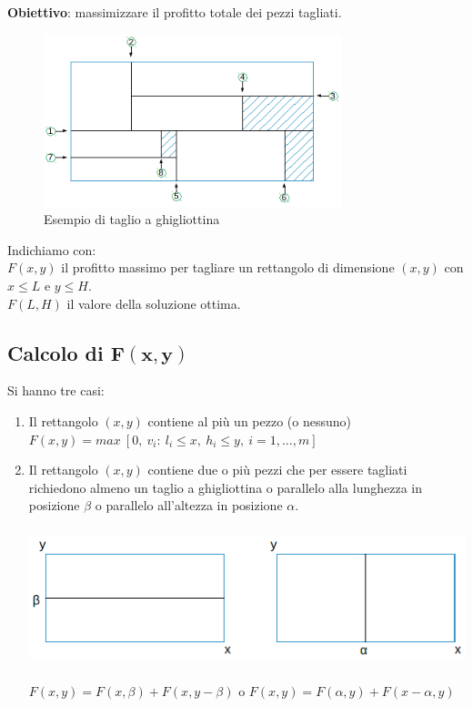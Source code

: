 \textbf{Obiettivo}: massimizzare il profitto totale dei pezzi tagliati.

\begin{figure}[h]
	\centering
	\includegraphics[height=5cm]{images/shape2.png}
	\caption{Esempio di taglio a ghigliottina}
\end{figure}
Indichiamo con:\\

$F(x,y)$ il profitto massimo per tagliare un rettangolo di dimensione $(x,y)$ con $x\le L$ e $y\le H$.\\
$F(L,H)$ il valore della soluzione ottima.

\clearpage
\subsection{Calcolo di $\boldsymbol{F(x,y)}$}
Si hanno tre casi:
\begin{enumerate}
	\item Il rettangolo $(x,y)$ contiene al più un pezzo (o nessuno) $F(x,y)=max\ [0,\ v_{i}:\ l_{i}\le x,\ h_{i}\le y,\ i=1,\dots,m]$
	\item Il rettangolo $(x,y)$ contiene due o più pezzi che per essere tagliati richiedono almeno un taglio a ghigliottina o parallelo alla lunghezza in posizione $\beta$ o parallelo all'altezza in posizione $\alpha$.
	\centerline{\includegraphics[height=4cm]{images/shape3.png}}
	$F(x,y)=F(x,\beta)+F(x,y-\beta)$ o $F(x,y)=F(\alpha,y)+F(x-\alpha,y)$
\end{enumerate}

